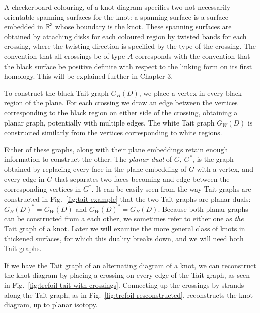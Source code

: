 \documentclass[12pt]{report}
\newcommand{\R}{\mathbb{R}}
\begin{document}
A checkerboard colouring, of a knot diagram specifies two not-necessarily orientable spanning surfaces for the knot: a spanning surface is a surface embedded in $\R^{3}$ whose boundary is the knot. These spanning surfaces are obtained by attaching disks for each coloured region by twisted bands for each crossing, where the twisting direction is specified by the type of the crossing. The convention that all crossings be of type $A$ corresponds with the convention that the black surface be positive definite with respect to the linking form on its first homology. This will be explained further in Chapter 3.

To construct the black Tait graph $G_{B}(D)$, we place a vertex in every black region of the plane. For each crossing we draw an edge between the vertices corresponding to the black region on either side of the crossing, obtaining a planar graph, potentially with multiple edges. The white Tait graph $G_{W}(D)$ is constructed similarly from the vertices corresponding to white regions.

Either of these graphs, along with their plane embeddings retain enough information to construct the other. The \textit{planar dual} of $G$, $G^{*}$, is the graph obtained by replacing every face in the plane embedding of $G$ with a vertex, and every edge in $G$ that separates two faces becoming and edge between the corresponding vertices in $G^{*}$. It can be easily seen from the way Tait graphs are constructed in Fig.~\ref{fig:tait-example} that the two Tait graphs are planar duals: $G_{B}(D)^{*} = G_{W}(D)$ and $G_{W}(D)^{*} = G_{B}(D)$. Because both planar graphs can be constructed from a each other, we sometimes refer to either one as \textit{the} Tait graph of a knot. Later we will examine the more general class of knots in thickened surfaces, for which this duality breaks down, and we will need both Tait graphs.

If we have the Tait graph of an alternating diagram of a knot, we can reconstruct the knot diagram by placing a crossing on every edge of the Tait graph, as seen in Fig.~\ref{fig:trefoil-tait-with-crossings}. Connecting up the crossings by strands along the Tait graph, as in Fig.~\ref{fig:trefoil-resconstructed},	 reconstructs the knot diagram, up to planar isotopy.
\end{document}
